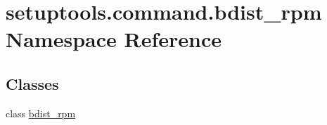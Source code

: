 \hypertarget{namespacesetuptools_1_1command_1_1bdist__rpm}{}\section{setuptools.\+command.\+bdist\+\_\+rpm Namespace Reference}
\label{namespacesetuptools_1_1command_1_1bdist__rpm}
\subsection*{Classes}
\begin{DoxyCompactItemize}
\item 
class \hyperlink{classsetuptools_1_1command_1_1bdist__rpm_1_1bdist__rpm}{bdist\+\_\+rpm}
\end{DoxyCompactItemize}
